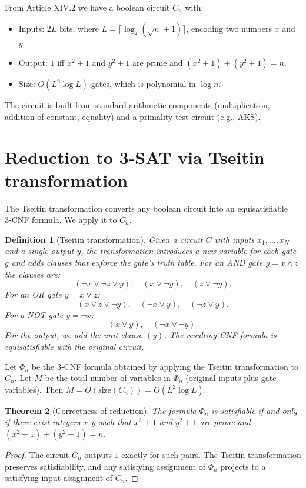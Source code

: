\documentclass[11pt,a4paper]{article}
\newtheorem{theorem}{Theorem}[section]
\newtheorem{definition}[theorem]{Definition}
\begin{document}
From Article XIV.2 we have a boolean circuit \(C_n\) with:
\begin{itemize}
\item Inputs: \(2L\) bits, where \(L = \lceil \log_2(\sqrt{n}+1)\rceil\), encoding two numbers \(x\) and \(y\).
\item Output: \(1\) iff \(x^2+1\) and \(y^2+1\) are prime and \((x^2+1)+(y^2+1)=n\).
\item Size: \(O(L^2 \log L)\) gates, which is polynomial in \(\log n\).
\end{itemize}
The circuit is built from standard arithmetic components (multiplication, addition of constant, equality) and a primality test circuit (e.g., AKS).

\section{Reduction to 3‑SAT via Tseitin transformation}

The Tseitin transformation converts any boolean circuit into an equisatisfiable 3‑CNF formula. We apply it to \(C_n\).

\begin{definition}[Tseitin transformation]
Given a circuit \(C\) with inputs \(x_1,\dots,x_N\) and a single output \(y\), the transformation introduces a new variable for each gate \(g\) and adds clauses that enforce the gate’s truth table. For an AND gate \(y = x \land z\) the clauses are:
\[
(\neg x \lor \neg z \lor y),\quad (x \lor \neg y),\quad (z \lor \neg y).
\]
For an OR gate \(y = x \lor z\):
\[
(x \lor z \lor \neg y),\quad (\neg x \lor y),\quad (\neg z \lor y).
\]
For a NOT gate \(y = \neg x\):
\[
(x \lor y),\quad (\neg x \lor \neg y).
\]
For the output, we add the unit clause \((y)\). The resulting CNF formula is equisatisfiable with the original circuit.
\end{definition}

Let \(\Phi_n\) be the 3‑CNF formula obtained by applying the Tseitin transformation to \(C_n\). Let \(M\) be the total number of variables in \(\Phi_n\) (original inputs plus gate variables). Then \(M = O(\text{size}(C_n)) = O(L^2 \log L)\).

\begin{theorem}[Correctness of reduction]\label{thm:reduction}
The formula \(\Phi_n\) is satisfiable if and only if there exist integers \(x,y\) such that \(x^2+1\) and \(y^2+1\) are prime and \((x^2+1)+(y^2+1)=n\).
\end{theorem}
\begin{proof}
The circuit \(C_n\) outputs \(1\) exactly for such pairs. The Tseitin transformation preserves satisfiability, and any satisfying assignment of \(\Phi_n\) projects to a satisfying input assignment of \(C_n\).
\end{proof}
\end{document}
